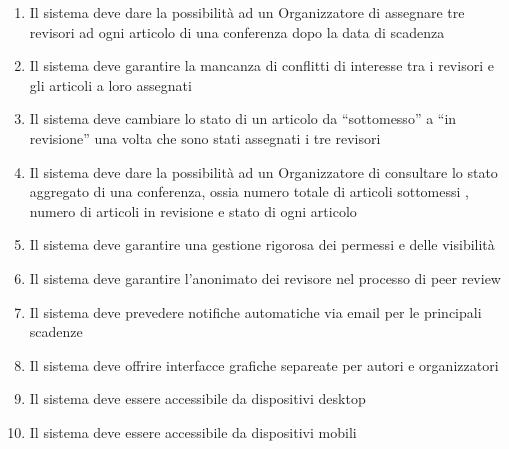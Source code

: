 \begin{enumerate}
\item Il sistema deve dare la possibilità ad un Organizzatore di assegnare tre revisori ad ogni articolo di una conferenza dopo la data di scadenza
\item Il sistema deve garantire la mancanza di conflitti di interesse tra i revisori e gli articoli a loro assegnati
\item Il sistema deve cambiare lo stato di un articolo da ``sottomesso'' a ``in revisione'' una volta che sono stati assegnati i tre revisori
\item Il sistema deve dare la possibilità ad un Organizzatore di consultare lo stato aggregato di una conferenza, ossia numero totale di articoli sottomessi
  , numero di articoli in revisione e stato di ogni articolo
\item Il sistema deve garantire una gestione rigorosa dei permessi e delle visibilità
\item Il sistema deve garantire l'anonimato dei revisore nel processo di peer review
\item Il sistema deve prevedere notifiche automatiche via email per le principali scadenze
\item Il sistema deve offrire interfacce grafiche separeate per autori e organizzatori
\item Il sistema deve essere accessibile da dispositivi desktop
\item Il sistema deve essere accessibile da dispositivi mobili
\end{enumerate}




